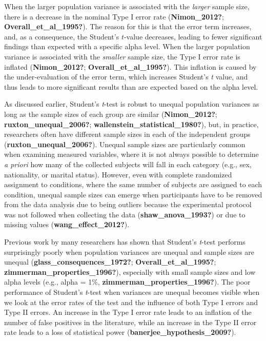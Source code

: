 \documentclass[
  english,
  man]{apa6}
\begin{document}
When the larger population variance is associated with the \emph{larger} sample size, there is a decrease in the nominal Type I error rate (\textbf{Nimon\_2012?}; \textbf{Overall\_et\_al\_1995?}). The reason for this is that the error term increases, and, as a consequence, the Student's \(t\)-value decreases, leading to fewer significant findings than expected with a specific alpha level. When the larger population variance is associated with the \emph{smaller} sample size, the Type I error rate is inflated (\textbf{Nimon\_2012?}; \textbf{Overall\_et\_al\_1995?}). This inflation is caused by the under-evaluation of the error term, which increases Student's \emph{t} value, and thus leads to more significant results than are expected based on the alpha level.

As discussed earlier, Student's \emph{t}-test is robust to unequal population variances as long as the sample sizes of each group are similar (\textbf{Nimon\_2012?}; \textbf{ruxton\_unequal\_2006?}; \textbf{wallenstein\_statistical\_1980?}), but, in practice, researchers often have different sample sizes in each of the independent groups (\textbf{ruxton\_unequal\_2006?}). Unequal sample sizes are particularly common when examining measured variables, where it is not always possible to determine \emph{a priori} how many of the collected subjects will fall in each category (e.g., sex, nationality, or marital status). However, even with complete randomized assignment to conditions, where the same number of subjects are assigned to each condition, unequal sample sizes can emerge when participants have to be removed from the data analysis due to being outliers because the experimental protocol was not followed when collecting the data (\textbf{shaw\_anova\_1993?}) or due to missing values (\textbf{wang\_effect\_2012?}).

Previous work by many researchers has shown that Student's \emph{t}-test performs surprisingly poorly when population variances are unequal and sample sizes are unequal (\textbf{glass\_consequences\_1972?}; \textbf{Overall\_et\_al\_1995?}; \textbf{zimmerman\_properties\_1996?}), especially with small sample sizes and low alpha levels (e.g., alpha = 1\%, \textbf{zimmerman\_properties\_1996?}). The poor performance of Student's \emph{t}-test when variances are unequal becomes visible when we look at the error rates of the test and the influence of both Type I errors and Type II errors. An increase in the Type I error rate leads to an inflation of the number of false positives in the literature, while an increase in the Type II error rate leads to a loss of statistical power (\textbf{banerjee\_hypothesis\_2009?}).
\end{document}
